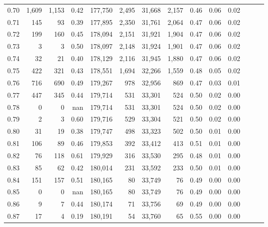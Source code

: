 \begin{tabular}{rrrrrrrrrrrrrr}
0.70 &   1,609 &  1,153 &  0.42 &  177,750 &    2,495 &  31,668 &   2,157 &  0.46 &  0.06 &      0.02 \\
0.71 &     145 &     93 &  0.39 &  177,895 &    2,350 &  31,761 &   2,064 &  0.47 &  0.06 &      0.02 \\
0.72 &     199 &    160 &  0.45 &  178,094 &    2,151 &  31,921 &   1,904 &  0.47 &  0.06 &      0.02 \\
0.73 &       3 &      3 &  0.50 &  178,097 &    2,148 &  31,924 &   1,901 &  0.47 &  0.06 &      0.02 \\
0.74 &      32 &     21 &  0.40 &  178,129 &    2,116 &  31,945 &   1,880 &  0.47 &  0.06 &      0.02 \\
0.75 &     422 &    321 &  0.43 &  178,551 &    1,694 &  32,266 &   1,559 &  0.48 &  0.05 &      0.02 \\
0.76 &     716 &    690 &  0.49 &  179,267 &      978 &  32,956 &     869 &  0.47 &  0.03 &      0.01 \\
0.77 &     447 &    345 &  0.44 &  179,714 &      531 &  33,301 &     524 &  0.50 &  0.02 &      0.00 \\
0.78 &       0 &      0 &   nan &  179,714 &      531 &  33,301 &     524 &  0.50 &  0.02 &      0.00 \\
0.79 &       2 &      3 &  0.60 &  179,716 &      529 &  33,304 &     521 &  0.50 &  0.02 &      0.00 \\
0.80 &      31 &     19 &  0.38 &  179,747 &      498 &  33,323 &     502 &  0.50 &  0.01 &      0.00 \\
0.81 &     106 &     89 &  0.46 &  179,853 &      392 &  33,412 &     413 &  0.51 &  0.01 &      0.00 \\
0.82 &      76 &    118 &  0.61 &  179,929 &      316 &  33,530 &     295 &  0.48 &  0.01 &      0.00 \\
0.83 &      85 &     62 &  0.42 &  180,014 &      231 &  33,592 &     233 &  0.50 &  0.01 &      0.00 \\
0.84 &     151 &    157 &  0.51 &  180,165 &       80 &  33,749 &      76 &  0.49 &  0.00 &      0.00 \\
0.85 &       0 &      0 &   nan &  180,165 &       80 &  33,749 &      76 &  0.49 &  0.00 &      0.00 \\
0.86 &       9 &      7 &  0.44 &  180,174 &       71 &  33,756 &      69 &  0.49 &  0.00 &      0.00 \\
0.87 &      17 &      4 &  0.19 &  180,191 &       54 &  33,760 &      65 &  0.55 &  0.00 &      0.00 \\

\end{tabular}
